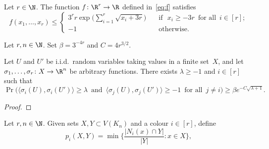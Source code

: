 \begin{lemma}\label{lem:special-function}
    Let $r \in \N$. The function $f \colon \R^r \to \R$ defined in~\eqref{eq:f} satisfies
    $$
    f(x_1,\dots,x_r) \le \left\{\begin{array}{cl}
    3^r r \exp\bigg( \displaystyle\sum_{i = 1}^r \sqrt{ x_i + 3r } \bigg) \quad & \text{if } \,\, x_i \ge - 3r \,\text{ for all }\, i \in [r];\\[+3ex]
    -1 & \text{otherwise.} 
    \end{array} \right.
    $$
\end{lemma}



\begin{lemma}
    \label{lem:geometric}
    Let $r, n\in\N$. Set $\beta = 3^{-4r}$ and $C = 4r^{3/2}$.

    Let\/ $U$ and\/ $U'$ be i.i.d.~random variables taking values in a finite set~$X$, and let $\sigma_1,\ldots,\sigma_r \colon X \to \R^n$ be arbitrary functions. There exists $\lambda\ge-1$ and\/ $i\in[r]$ such that
    $$\Pr\Big( \big\langle \sigma_i(U),\sigma_i(U') \big\rangle \ge \lambda \, \text{ and } \, \big\langle \sigma_j(U), \sigma_j(U') \big\rangle \ge -1 \, \text{ for all } \, j \ne i \Big) \ge \beta e^{- C\sqrt{\lambda + 1}}.$$
\end{lemma}

\begin{proof}
    \leanok
\end{proof}



\begin{definition}
    \label{def:p}
    Let $r, n\in\N$. Given sets $X,Y \subset V(K_n)$ and a colour $i \in [r]$, define
    $$p_i(X,Y) = \min\bigg\{ \frac{|N_i(x) \cap Y|}{|Y|} : x \in X \bigg\},$$
\end{definition}

